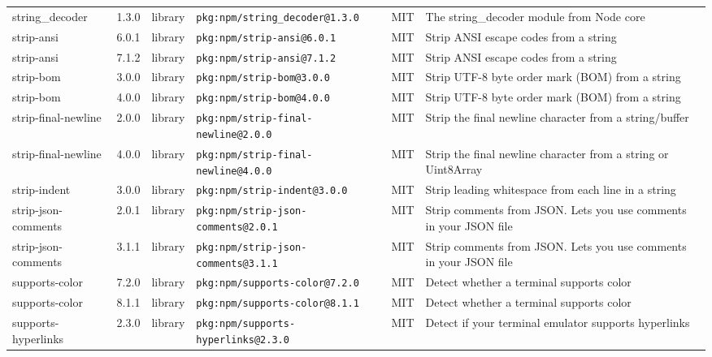 \documentclass[11pt,a4paper]{article}
\begin{document}
\begin{longtable}{|p{4cm}|p{2cm}|p{1.6cm}|p{5cm}|p{1.5cm}|p{3.5cm}|}
\raggedright string\_decoder & 1.3.0 & library & \small\texttt{pkg:npm/string\_decoder@1.3.0} & MIT & \small The string\_decoder module from Node core \\
\raggedright strip-ansi & 6.0.1 & library & \small\texttt{pkg:npm/strip-ansi@6.0.1} & MIT & \small Strip ANSI escape codes from a string \\
\raggedright strip-ansi & 7.1.2 & library & \small\texttt{pkg:npm/strip-ansi@7.1.2} & MIT & \small Strip ANSI escape codes from a string \\
\raggedright strip-bom & 3.0.0 & library & \small\texttt{pkg:npm/strip-bom@3.0.0} & MIT & \small Strip UTF-8 byte order mark (BOM) from a string \\
\raggedright strip-bom & 4.0.0 & library & \small\texttt{pkg:npm/strip-bom@4.0.0} & MIT & \small Strip UTF-8 byte order mark (BOM) from a string \\
\raggedright strip-final-newline & 2.0.0 & library & \small\texttt{pkg:npm/strip-final-newline@2.0.0} & MIT & \small Strip the final newline character from a string/buffer \\
\raggedright strip-final-newline & 4.0.0 & library & \small\texttt{pkg:npm/strip-final-newline@4.0.0} & MIT & \small Strip the final newline character from a string or Uint8Array \\
\raggedright strip-indent & 3.0.0 & library & \small\texttt{pkg:npm/strip-indent@3.0.0} & MIT & \small Strip leading whitespace from each line in a string \\
\raggedright strip-json-comments & 2.0.1 & library & \small\texttt{pkg:npm/strip-json-comments@2.0.1} & MIT & \small Strip comments from JSON. Lets you use comments in your JSON file \\
\raggedright strip-json-comments & 3.1.1 & library & \small\texttt{pkg:npm/strip-json-comments@3.1.1} & MIT & \small Strip comments from JSON. Lets you use comments in your JSON file \\
\raggedright supports-color & 7.2.0 & library & \small\texttt{pkg:npm/supports-color@7.2.0} & MIT & \small Detect whether a terminal supports color \\
\raggedright supports-color & 8.1.1 & library & \small\texttt{pkg:npm/supports-color@8.1.1} & MIT & \small Detect whether a terminal supports color \\
\raggedright supports-hyperlinks & 2.3.0 & library & \small\texttt{pkg:npm/supports-hyperlinks@2.3.0} & MIT & \small Detect if your terminal emulator supports hyperlinks \\

\end{longtable}
\end{document}
